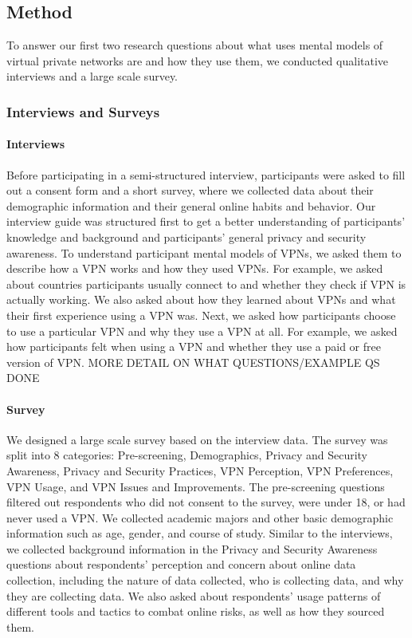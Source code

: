 \subsection{Method}

To answer our first two research questions about  what uses mental models of
virtual private networks are and how they use them,  we conducted
qualitative interviews and a large scale survey. 


\subsubsection{Interviews and Surveys} 

\paragraph{Interviews}
Before participating in a semi-structured interview, participants were asked
to fill out a consent form and a short survey, where we collected data about
their demographic information and their general online habits and behavior.
Our interview guide was structured first to get a better understanding of
participants' knowledge and background and participants' general privacy and
security awareness. To understand participant mental models of VPNs, we asked
them to describe how a VPN works and how they used VPNs. For example, we asked
about countries participants usually connect to and whether they check if VPN
is actually working. We also asked about how they learned about VPNs and what
their first experience using a VPN was. Next, we asked how participants choose
to use a particular VPN and why they use a VPN at all. For example, we asked
how participants felt when using a VPN and whether they use a paid or free
version of VPN.  MORE DETAIL ON WHAT QUESTIONS/EXAMPLE QS DONE
 
\paragraph{Survey}
We designed a large scale survey based on the interview data.  The survey was split into 8 categories: Pre-screening, Demographics, Privacy and
Security Awareness, Privacy and Security Practices, VPN Perception, VPN
Preferences, VPN Usage, and VPN Issues and Improvements. The pre-screening questions
filtered out respondents who did not consent to the survey, were under 18, or
had never used a VPN. We collected academic
majors and other basic demographic information such as age, gender, and course of study. Similar to the interviews, we collected background information in the Privacy and Security Awareness questions about respondents' perception
and concern about online data collection, including the nature of data
collected, who is collecting data, and why they are collecting data. We also asked about respondents' usage patterns
of different tools and tactics to combat online risks, as well as how they
sourced them.

